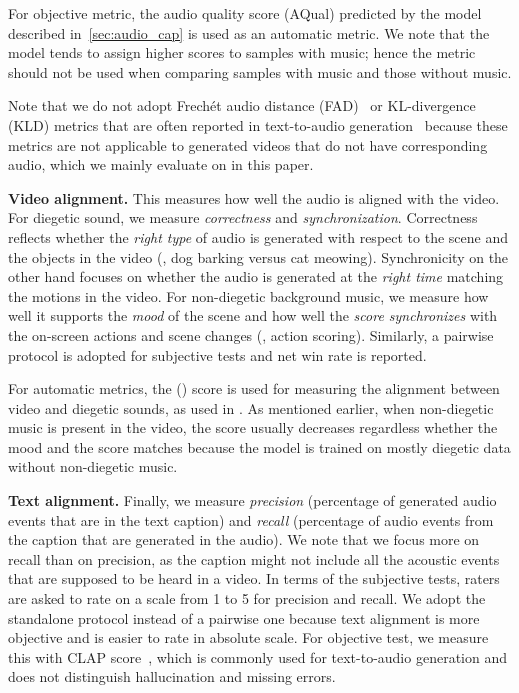 For objective metric, the audio quality score (AQual) predicted by the model described in~\cref{sec:audio_cap} is used as an automatic metric.
We note that the model tends to assign higher scores to samples with music;
hence the metric should not be used when comparing samples with music and those without music.

Note that we do not adopt Frech\'et audio distance (FAD)~\citep{kilgour2018fr} or KL-divergence (KLD) metrics that are often reported in text-to-audio generation~\citep{liu2023audioldm, vyas2023audiobox}
because these metrics are not applicable to generated videos that do not have corresponding audio, which we mainly evaluate on in this paper.


\noindent\textbf{Video alignment.}
This measures how well the audio is aligned with the video. %
For diegetic sound, we measure \textit{correctness} and \textit{synchronization}.
Correctness reflects whether the \textit{right type} of audio is generated with respect to the scene and the objects in the video (\eg, dog barking versus cat meowing).
Synchronicity on the other hand focuses on whether the audio is generated at the \textit{right time} matching the motions in the video.
For non-diegetic background music, we measure how well it supports the \textit{mood} of the scene and how well the \textit{score synchronizes} with the on-screen actions and scene changes (\ie, action scoring).
Similarly, a pairwise protocol is adopted for subjective tests and net win rate is reported.

For automatic metrics, the \IB (\IBShort) score is used for measuring the alignment between video and diegetic sounds, as used in \citet{mei2023foleygen}.
As mentioned earlier, when non-diegetic music is present in the video,
the score usually decreases regardless whether the mood and the score matches because the model is trained on mostly diegetic data without non-diegetic music.


\noindent\textbf{Text alignment.}
Finally, we measure \textit{precision} (percentage of generated audio events that are in the text caption) and \textit{recall} (percentage of audio events from the caption that are generated in the audio).
We note that we focus more on recall than on precision, as the caption might not include all the acoustic events that are supposed to be heard in a video.
In terms of the subjective tests, raters are asked to rate on a scale from 1 to 5 for precision and recall.
We adopt the standalone protocol instead of a pairwise one because text alignment is more objective and is easier to rate in absolute scale.
For objective test, we measure this with CLAP score~\citep{wu2023clap},
which is commonly used for text-to-audio generation and does not distinguish hallucination and missing errors.

